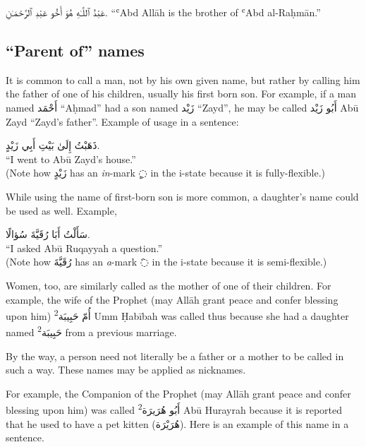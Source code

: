 \documentclass[
  10pt,
]{book}
\begin{document}
\foreignlanguage{arabic}{عَبْدُ ٱللَّـٰهِ هُوَ أَخُو عَبْدِ ٱلرَّحْمَـٰنِ.}
\enquote{ʿAbd Allāh is the brother of ʿAbd al-Raḥmān.}

\subsection{\texorpdfstring{\enquote{Parent of} names}{``Parent of'' names}}\label{parent-of-names}

It is common to call a man, not by his own given name, but rather by calling him the father of one of his children, usually his first born son. For example, if a man named \foreignlanguage{arabic}{أَحْمَد} \enquote{Aḥmad} had a son named \foreignlanguage{arabic}{زَيْد} \enquote{Zayd}, he may be called \foreignlanguage{arabic}{أَبُو زَيْد} Abū Zayd \enquote{Zayd's father}. Example of usage in a sentence:

\foreignlanguage{arabic}{ذَهَبْتُ إِلَىٰ بَيْتِ أَبِي زَيْدٍ.}\\
\enquote{I went to Abū Zayd's house.}\\
(Note how \foreignlanguage{arabic}{زَيْدٍ} has an \emph{in}-mark \foreignlanguage{arabic}{◌ٍ} in the i-state because it is fully-flexible.)

While using the name of first-born son is more common, a daughter's name could be used as well. Example,

\foreignlanguage{arabic}{سَأَلْتُ أَبَا رُقَيَّةَ سُؤالًا.}\\
\enquote{I asked Abū Ruqayyah a question.}\\
(Note how \foreignlanguage{arabic}{رُقَيَّةَ} has an \emph{a}-mark \foreignlanguage{arabic}{◌َ} in the i-state because it is semi-flexible.)

Women, too, are similarly called as the mother of one of their children. For example,
the wife of the Prophet
(may Allāh grant peace and confer blessing upon him)
\foreignlanguage{arabic}{أُمّ حَبِيبَة\textsuperscript{2}} Umm Ḥabībah
was called thus because she had a daughter named
\foreignlanguage{arabic}{حَبِيبَة\textsuperscript{2}}
from a previous marriage.

By the way, a person need not literally be a father or a mother to be called in such a way. These names may be applied as nicknames.

For example, the Companion of the Prophet
(may Allāh grant peace and confer blessing upon him)
was called
\foreignlanguage{arabic}{أَبُو هُرَيرَة\textsuperscript{2}}
Abū Hurayrah
because it is reported that he used to have a pet kitten (\foreignlanguage{arabic}{هُرَيْرَة}). Here is an example of this name in a sentence.
\end{document}
